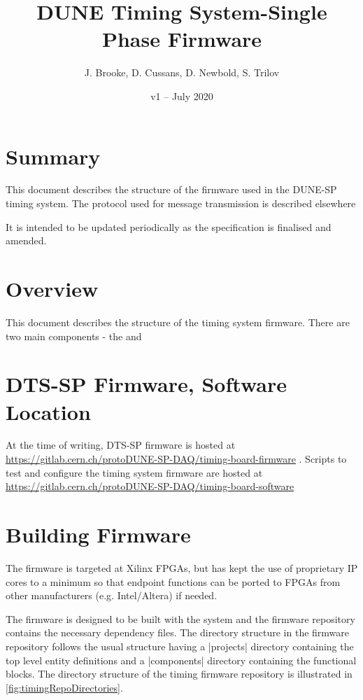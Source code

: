 \documentclass{dune}
\title{DUNE Timing System-Single Phase Firmware}
\author{J. Brooke, D. Cussans, D. Newbold, S. Trilov}
\date{v1 -- July 2020}
\begin{document}
\maketitle
\tableofcontents


\section{Summary}

This document describes the structure of the firmware used in the DUNE-SP timing system. The protocol used for message transmission is described elsewhere\cite{ref:dts-sp-timing-protocol}

It is intended to be updated periodically as the specification is finalised and amended.

\section{Overview}

This document describes the structure of the timing system firmware. There are two main components - the  and 

\section{DTS-SP Firmware, Software Location}

At the time of writing, DTS-SP firmware is hosted at \url{https://gitlab.cern.ch/protoDUNE-SP-DAQ/timing-board-firmware} . Scripts to test and configure the timing system firmware are hosted at \url{https://gitlab.cern.ch/protoDUNE-SP-DAQ/timing-board-software}

\section{Building Firmware}

The firmware is targeted at Xilinx FPGAs, but has kept the use of proprietary IP cores to a minimum so that endpoint functions can be ported to FPGAs from other manufacturers (e.g. Intel/Altera) if needed.

The firmware is designed to be built with the  system and the firmware repository contains the necessary dependency files. The directory structure in the firmware repository follows the usual  structure having a |projects| directory containing the top level entity definitions and a |components| directory containing the functional blocks. The directory structure of the timing firmware repository is illustrated in \ref{fig:timingRepoDirectories}.
\end{document}
